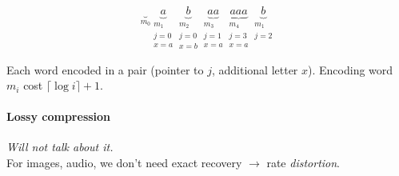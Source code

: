 \[\underbrace{\;}_{m_0}
\underbrace{a}_{\substack{m_1 \\ j=0\\x=a}}
\underbrace{b}_{\substack{m_2 \\ j=0\\x=b}}
\underbrace{aa}_{\substack{m_3 \\ j=1\\x=a}}
\underbrace{aaa}_{\substack{m_4 \\ j=3\\x=a}}
\underbrace{b}_{\substack{m_1 \\ j=2}}\]


Each word encoded in a pair (pointer to $j$, additional letter $x$). Encoding word $m_i$ cost $\lceil \log i \rceil + 1$.

\paragraph{Lossy compression} \textit{Will not talk about it.}\\
For images, audio, we don't need exact recovery $\rightarrow$ rate \emph{distortion}.
